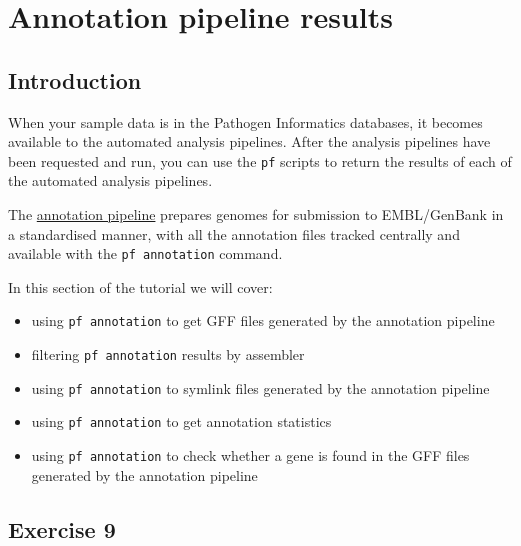 \documentclass[11pt]{article}
\providecommand{\tightlist}{%
      \setlength{\itemsep}{0pt}\setlength{\parskip}{0pt}}
\begin{document}



\newpage






    \hypertarget{annotation-pipeline-results}{%
\section{Annotation pipeline
results}\label{annotation-pipeline-results}}

    \hypertarget{introduction}{%
\subsection{Introduction}\label{introduction}}

When your sample data is in the Pathogen Informatics databases, it
becomes available to the automated analysis pipelines. After the
analysis pipelines have been requested and run, you can use the
\texttt{pf} scripts to return the results of each of the automated
analysis pipelines.

The
\href{http://mediawiki.internal.sanger.ac.uk/index.php/Pathogen_Informatics_Automated_Annotation_Pipeline}{annotation
pipeline} prepares genomes for submission to EMBL/GenBank in a
standardised manner, with all the annotation files tracked centrally and
available with the \texttt{pf\ annotation} command.

In this section of the tutorial we will cover:

\begin{itemize}
\tightlist
\item
  using \texttt{pf\ annotation} to get GFF files generated by the
  annotation pipeline
\item
  filtering \texttt{pf\ annotation} results by assembler
\item
  using \texttt{pf\ annotation} to symlink files generated by the
  annotation pipeline
\item
  using \texttt{pf\ annotation} to get annotation statistics
\item
  using \texttt{pf\ annotation} to check whether a gene is found in the
  GFF files generated by the annotation pipeline
\end{itemize}

    \hypertarget{exercise-9}{%
\subsection{Exercise 9}\label{exercise-9}}
\end{document}
